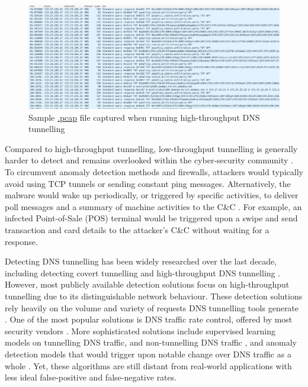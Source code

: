 \documentclass[a4paper]{report}
\begin{document}
\begin{figure}[h!]
  \includegraphics[width=\textwidth]{imgs/data-exfil-high-throughput-pcap.jpg}
  \caption{Sample \url{.pcap} file captured when running high-throughput DNS tunnelling}
  \label{fig:dns-high-throughput-tunnelling}
\end{figure}

Compared to high-throughput tunnelling, low-throughput tunnelling is generally harder to detect and remains overlooked within the cyber-security community \cite{nadler-2017, nadler-201936, ahmed-2020}.
To circumvent anomaly detection methods and firewalls, attackers would typically avoid using TCP tunnels or sending constant ping messages. Alternatively, the malware would wake up periodically, or triggered by specific activities, to deliver poll messages and a summary of machine activities to the C\&C \cite{nadler-2018}. For example, an infected Point-of-Sale (POS) terminal would be triggered upon a swipe and send transaction and card details to the attacker's C\&C without waiting for a response.

Detecting DNS tunnelling has been widely researched over the last decade, including detecting covert tunnelling \cite{gilbert-2009, davis-2016} and high-throughput DNS tunnelling \cite{wang-2016, buczak-2016, cambiaso-2016, engelstad-2017, homem-2017, kara-2014, sheridan-2015}. However, most publicly available detection solutions focus on high-throughput tunnelling due to its distinguishable network behaviour. These detection solutions rely heavily on the volume and variety of requests DNS tunnelling tools generate \cite{nadler-2017, nadler-2018}. One of the most popular solutions is DNS traffic rate control, offered by most security vendors \cite{homem-2017, nadler-2017}. More sophisticated solutions include supervised learning models on tunnelling DNS traffic, and non-tunnelling DNS traffic \cite{buczak-2016}, and anomaly detection models that would trigger upon notable change over DNS traffic as a whole \cite{davis-2016, sheridan-2015}. Yet, these algorithms are still distant from real-world applications with less ideal false-positive and false-negative rates.
\end{document}
